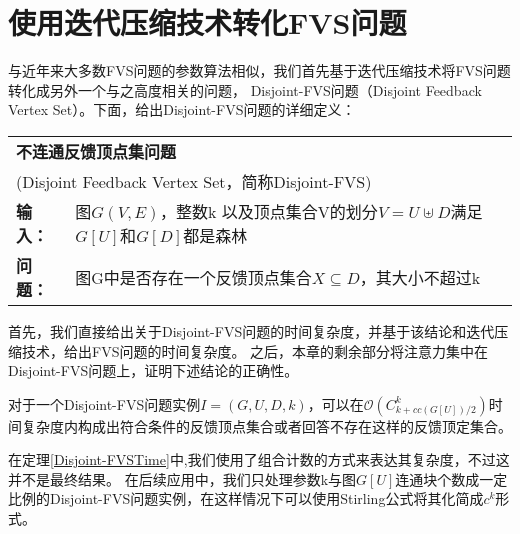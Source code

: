 \section{使用迭代压缩技术转化FVS问题}
与近年来大多数FVS问题的参数算法相似，我们首先基于迭代压缩技术将FVS问题转化成另外一个与之高度相关的问题，
Disjoint-FVS问题（Disjoint Feedback Vertex Set）。下面，给出Disjoint-FVS问题的详细定义：\\

\begin{tabular}{ | p{0.06\headwidth} p{0.80\headwidth} | }
  \hline
  \multicolumn{2}{|l|}{ \textbf{不连通反馈顶点集问题} }\\
  \multicolumn{2}{|l|}{ (Disjoint Feedback Vertex Set，简称Disjoint-FVS)}\\
  \textbf{输入：} & 图$G(V, E)$，整数k 以及顶点集合V的划分$V = U \uplus D$满足$G[U]$和$G[D]$都是森林\\
  \textbf{问题：} & 图G中是否存在一个反馈顶点集合$X \subseteq D$，其大小不超过k\\
  \hline
\end{tabular} \vspace{0.5cm}

首先，我们直接给出关于Disjoint-FVS问题的时间复杂度，并基于该结论和迭代压缩技术，给出FVS问题的时间复杂度。
之后，本章的剩余部分将注意力集中在Disjoint-FVS问题上，证明下述结论的正确性。
\begin{theorem} \label{Disjoint-FVSTime}
  对于一个Disjoint-FVS问题实例$I = (G, U, D, k)$，可以在$\mathcal{O}(C^k_{k + cc(G[U])/2})$时间复杂度内构成出符合条件的反馈顶点集合或者回答不存在这样的反馈顶定集合。
\end{theorem}

在定理\ref{Disjoint-FVSTime}中,我们使用了组合计数的方式来表达其复杂度，不过这并不是最终结果。
在后续应用中，我们只处理参数k与图$G[U]$连通块个数成一定比例的Disjoint-FVS问题实例，在这样情况下可以使用Stirling公式将其化简成$c^k$形式。

